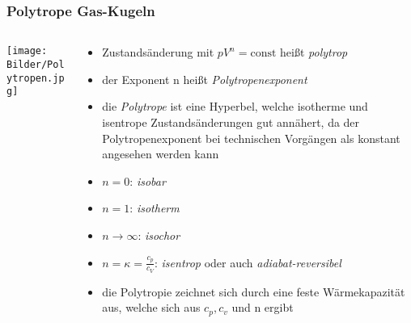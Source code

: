 \documentclass{beamer}
\begin{document}
\begin{frame}\frametitle{Polytrope Gas-Kugeln}

\begin{columns}

\begin{column}{.48\textwidth}

\texttt{[image: Bilder/Polytropen.jpg]}

\end{column}

\hfill

\begin{column}{.48\textwidth}

\tiny

\begin{itemize}

\item Zustandsänderung mit $pV^{n}=\mathrm{const}$ heißt \textit{polytrop}
\item der Exponent n heißt \textit{Polytropenexponent}
\item die \textit{Polytrope} ist eine Hyperbel, welche isotherme und isentrope Zustandsänderungen gut annähert, da der Polytropenexponent bei technischen Vorgängen als konstant angesehen werden kann
\item $n = 0$: \textit{isobar}
\item $n = 1$: \textit{isotherm}
\item $n \to \infty $: \textit{isochor}
\item $n = \kappa  =  \frac{c_{p}}{c_{V}}$: \textit{isentrop} oder auch \textit{adiabat-reversibel}
\item die Polytropie zeichnet sich durch eine feste Wärmekapazität aus, welche sich aus $c_p, c_v$ und n ergibt

\end{itemize}

\end{column}

\end{columns}

\end{frame}
\end{document}
